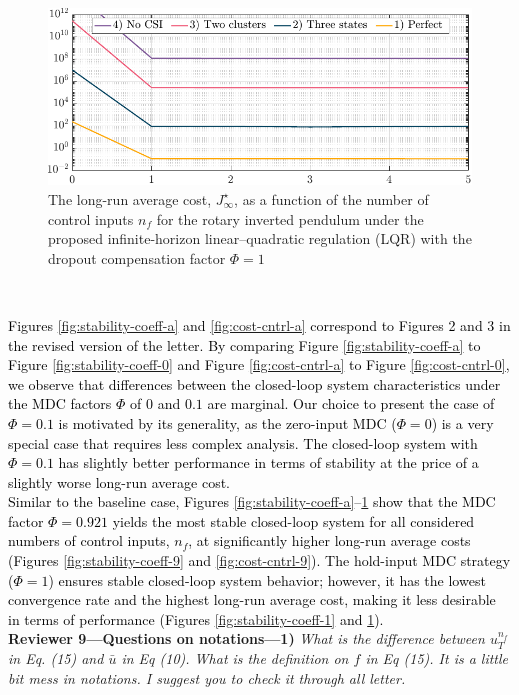{\begin{figure}[h!]
\begin{center}
\includegraphics[width=0.8\columnwidth]{./responses-rev-1/cost-cntrl-1.pdf}
\caption{The long-run average cost, $J_{\infty}^{\star}$, as a function of the number of control inputs $n_f$ for the rotary inverted pendulum under the proposed infinite-horizon linear–quadratic regulation (LQR) with the dropout compensation factor $\mathit{\Phi}=1$}\label{fig:cost-cntrl-1}
\end{center}
\end{figure}\\
}
\textcolor{black}{Figures \ref{fig:stability-coeff-a} and \ref{fig:cost-cntrl-a} correspond to Figures 2 and 3 in the revised version of the letter. By comparing Figure \ref{fig:stability-coeff-a} to Figure \ref{fig:stability-coeff-0} and Figure \ref{fig:cost-cntrl-a} to Figure \ref{fig:cost-cntrl-0}, we observe that differences between the closed-loop system characteristics under the MDC factors $\mathit{\Phi}$ of $0$ and $0.1$ are marginal. Our choice to present the case of $\mathit{\Phi}=0.1$ is motivated by its generality, as the zero-input MDC ($\mathit{\Phi}=0$) is a very special case that requires less complex analysis. The closed-loop system with $\mathit{\Phi}=0.1$ has slightly better performance in terms of stability at the price of a slightly worse long-run average cost.\\
Similar to the baseline case, Figures \ref{fig:stability-coeff-a}–\ref{fig:cost-cntrl-1} show that the MDC factor $\mathit{\Phi}=0.921$ yields the most stable closed-loop system for all considered numbers of control inputs, $n_f$, at significantly higher long-run average costs (Figures \ref{fig:stability-coeff-9} and \ref{fig:cost-cntrl-9}). The hold-input MDC strategy ($\mathit{\Phi}=1$) ensures stable closed-loop system behavior; however, it has the lowest convergence rate and the highest long-run average cost, making it less desirable in terms of performance (Figures \ref{fig:stability-coeff-1} and \ref{fig:cost-cntrl-1}).} \\[4mm]
\textbf{Reviewer 9—Questions on notations—1)}\textit{ %
What is the difference between $u^{n_f}_T$ in Eq. (15) and $\bar{u}$ in Eq (10). What is the definition on $f$ in Eq (15). It is a little bit mess in notations. I suggest you to check it through all letter.}\\[2mm]
